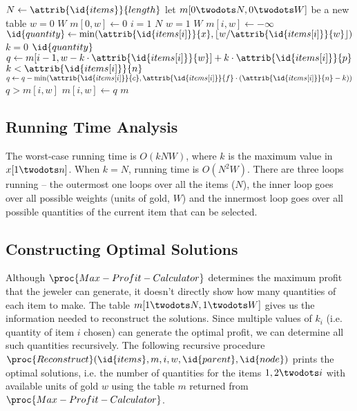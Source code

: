 \documentclass{article}
\newcommand{\floor}[1]{\left\lfloor #1 \right\rfloor}
\newcommand{\itemattr}[1]{\attrib{\id{items[i]}}{#1}}
\begin{document}
\begin{codebox}
\li $N \gets \attrib{\id{items}}{length}$
\li let $m[0 \twodots N, 0 \twodots W]$ be a new table
\li \For $w = 0$ \To $W$ \Do
\li 	$m[0, w] \gets 0$
	\End
\li \For $i = 1$ \To $N$ \Do
\li 	\For $w = 1$ \To $W$ \Do
\li 		$m[i, w] \gets -\infty$
\li 		$\id{quantity} \gets \min(\itemattr{x}, \floor{w/\itemattr{w}})$
\li			\For $k = 0$ \To $\id{quantity}$ \Do
\li 			$q \gets m[i-1, w-k \cdot \itemattr{w}] + k \cdot \itemattr{p}$
\li 			\If $k < \itemattr{n}$ \Then
\li 				$q \gets q - \min(\itemattr{c}, \itemattr{f} \cdot (\itemattr{n} - k))$
				\End
\li 			\If $q > m[i, w]$ \Then
\li 				$m[i, w] \gets q$
				\End
			\End
		\End
	\End
\li \Return $m$
\end{codebox}

\subsection*{Running Time Analysis}
The worst-case running time is $O(kNW)$, where $k$ is the maximum value in $x[1 \twodots n]$. When $k=N$, running time is $O(N^2W)$. There are three loops running -- the outermost one loops over all the items ($N$), the inner loop goes over all possible weights (units of gold, $W$) and the innermost loop goes over all possible quantities of the current item that can be selected.

\subsection*{Constructing Optimal Solutions}
Although $\proc{Max-Profit-Calculator}$ determines the maximum profit that the jeweler can generate, it doesn't directly show how many quantities of each item to make. The table $m[1 \twodots N,1 \twodots W]$ gives us the information needed to reconstruct the solutions. Since multiple values of $k_i$ (i.e. quantity of item $i$ chosen) can generate the optimal profit, we can determine all such quantities recursively. The following recursive procedure $\proc{Reconstruct}(\id{items}, m, i, w, \id{parent}, \id{node})$ prints the optimal solutions, i.e. the number of quantities for the items $1,2 \twodots i$ with available units of gold $w$ using the table $m$ returned from $\proc{Max-Profit-Calculator}$.
\end{document}

